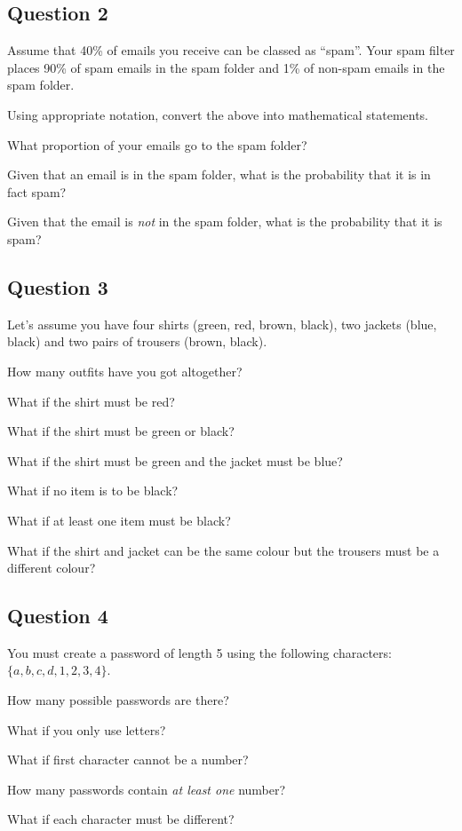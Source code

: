 \subsection*{Question 2}
Assume that 40\% of emails you receive can be classed as ``spam''. Your spam filter places 90\% of spam emails in the spam folder and 1\% of non-spam emails in the spam folder.\\[-0.2cm]


\item Using appropriate notation, convert the above into mathematical statements. \quad \item What proportion of your emails go to the spam folder? \quad \item Given that an email is in the spam folder, what is the probability that it is in fact spam? \quad \item Given that the email is \emph{not} in the spam folder, what is the probability that it is spam?


\subsection*{Question 3}
Let's assume you have four shirts (green, red, brown, black), two jackets (blue, black) and two pairs of trousers (brown, black).\\[-0.2cm]

\item How many outfits have you got altogether? \quad \item What if the shirt must be red? \quad \item What if the shirt must be green or black? \quad \item What if the shirt must be green and the jacket must be blue? \quad \item What if no item is to be black? \quad \item What if at least one item must be black? \quad \item What if the shirt and jacket can be the same colour but the trousers must be a different colour?


\subsection*{Question 4}
You must create a password of length 5 using the following characters:
$\{a,b,c,d,1,2,3,4\}$.\\[-0.2cm]

\item How many possible passwords are there? \quad \item What if you only use letters? \quad \item What if first character cannot be a number? \quad \item How many passwords contain \emph{at least one} number? \quad \item What if each character must be different?


